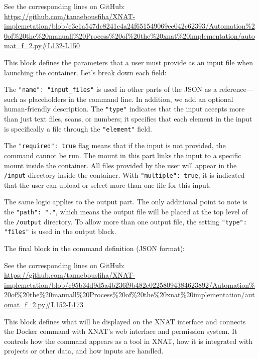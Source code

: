 \noindent\footnotesize See the corresponding lines on GitHub:\url{ https://github.com/tanaebousfiha/XNAT-implemetation/blob/e3c1a547dc8241c4a24f651549069ee042c62393/Automation%20of%20the%20manuall%20Process%20of%20the%20xnat%20implementation/automat_f_2.py#L132-L150}


This block defines the parameters that a user must provide as an input file when launching the container.
Let’s break down each field:

The \texttt{"name": "input\_files"} is used in other parts of the JSON as a reference---such as placeholders in the command line. In addition, we add an optional human-friendly description. The \texttt{"type"} indicates that the input accepts more than just text files, scans, or numbers; it specifies that each element in the input is specifically a file through the \texttt{"element"} field.

The \texttt{"required": true} flag means that if the input is not provided, the command cannot be run. The mount in this part links the input to a specific mount inside the container. All files provided by the user will appear in the \texttt{/input} directory inside the container. With \texttt{"multiple": true}, it is indicated that the user can upload or select more than one file for this input.

The same logic applies to the output part. The only additional point to note is the \texttt{"path": "."}, which means the output file will be placed at the top level of the \texttt{/output} directory. To allow more than one output file, the setting \texttt{"type": "files"} is used in the output block.

The final block in the command definition (JSON format):




\noindent\footnotesize See the corresponding lines on GitHub:\url{ https://github.com/tanaebousfiha/XNAT-implemetation/blob/c95b34d9d5a4b236f9b482e02258094384623892/Automation%20of%20the%20manuall%20Process%20of%20the%20xnat%20implementation/automat_f_2.py#L152-L173}




This block defines what will be displayed on the XNAT interface and connects the Docker command with XNAT's web interface and permission system. It controls how the command appears as a tool in XNAT, how it is integrated with projects or other data, and how inputs are handled.

